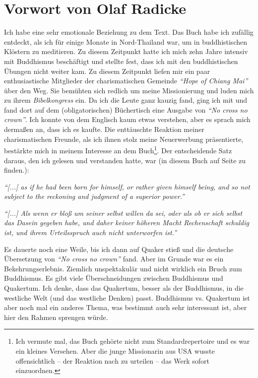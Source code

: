 \part{Vorwort von Olaf Radicke}


Ich habe eine sehr emotionale Beziehung zu dem Text. Das Buch habe ich zufällig
entdeckt, als ich für einige Monate in Nord-Thailand war, um in
buddhistischen
Klöstern zu meditieren. Zu diesem Zeitpunkt hatte ich mich zehn Jahre intensiv
mit
Buddhismus beschäftigt und stellte fest, dass ich mit den buddhistischen Übungen
nicht weiter kam. Zu diesem Zeitpunkt liefen mir ein paar enthusiastische
Mitglieder der charismatischen Gemeinde \textit{"`Hope of Chiang Mai"'} über
den Weg. Sie bemühten sich redlich um meine Missionierung und luden mich zu
ihrem \textit{Bibelkongress} ein. Da ich die Leute ganz kauzig fand, ging ich
mit und fand dort auf dem (obligatorischen) Büchertisch eine Ausgabe
von \textit{"`No cross no crown"'}.
Ich konnte von dem Englisch kaum etwas verstehen, aber es sprach mich dermaßen
an, dass ich es kaufte. Die enttäuschte Reaktion meiner charismatischen Freunde,
als ich ihnen stolz meine Neuerwerbung präsentierte, bestärkte mich in meinem
Interesse an dem Buch\footnote{Ich vermute mal, das Buch gehörte nicht zum
Standardrepertoire und es war ein kleines Versehen. Aber die junge Missionarin
aus USA wusste offensichtlich -- der Reaktion nach zu urteilen -- das Werk
sofort einzuordnen.}. Der entscheidende Satz daraus, den ich gelesen und
verstanden hatte, war (in diesem Buch auf
Seite \pageref{ref:vorw_sinndes_lebens} zu finden.):

\begin{center}
\parbox{7,5cm}{
\textit{"`[...] as if he had been born for himself, or rather given himself being,
and so not subject to the reckoning and judgment of a superior power."'}

\medskip

\textit{"`[...] Als wenn er bloß um seiner selbst willen da sei, oder als ob er
sich selbst das Dasein gegeben habe, und daher keiner höheren Macht Rechenschaft
schuldig ist, und ihrem Urteilsspruch auch nicht unterworfen ist."'}
}
\end{center}

\medskip

Es dauerte noch eine Weile, bis ich dann auf Quaker stieß und die deutsche
Übersetzung von \textit{"`No cross no crown"'} fand. Aber im Grunde war es ein
Bekehrungserlebnis. Ziemlich unspektakulär und nicht wirklich ein Bruch zum
Buddhismus. Es gibt viele Überschneidungen zwischen Buddhismus und Quakertum.
Ich denke, dass das Quakertum, besser als der Buddhismus, in die westliche Welt
(und das westliche
Denken) passt. Buddhismus vs. Quakertum ist aber noch mal
ein anderes Thema, was bestimmt auch sehr interessant ist, aber hier den Rahmen
sprengen würde.

